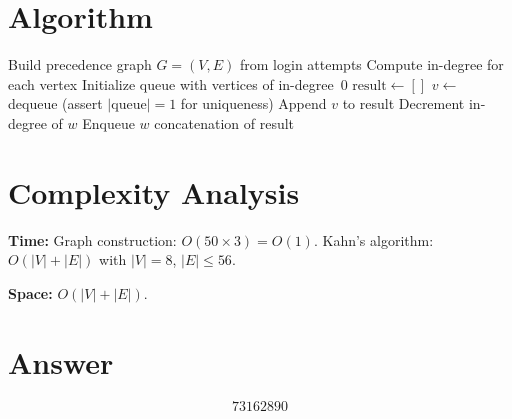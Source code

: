 \documentclass[11pt]{article}
\begin{document}
\section{Algorithm}

\begin{algorithm}[H]
\caption{Derive shortest passcode via topological sort}
\begin{algorithmic}[1]
\STATE Build precedence graph $G = (V, E)$ from login attempts
\STATE Compute in-degree for each vertex
\STATE Initialize queue with vertices of in-degree~0
\STATE $\text{result} \gets []$
    \STATE $v \gets$ dequeue (assert $|\text{queue}| = 1$ for uniqueness)
    \STATE Append $v$ to result
        \STATE Decrement in-degree of $w$
            \STATE Enqueue $w$
        \ENDIF
    \ENDFOR
\ENDWHILE
\RETURN concatenation of result
\end{algorithmic}
\end{algorithm}

\section{Complexity Analysis}

\textbf{Time:} Graph construction: $O(50 \times 3) = O(1)$. Kahn's algorithm: $O(|V| + |E|)$ with $|V| = 8$, $|E| \leq 56$.

\textbf{Space:} $O(|V| + |E|)$.

\section{Answer}

\[
\boxed{73162890}
\]
\end{document}
